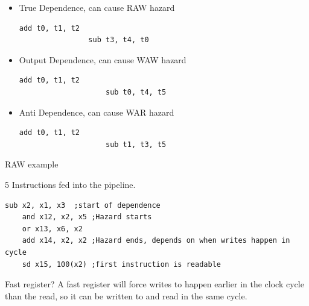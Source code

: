 \documentclass{report}
\begin{document}
\begin{description}
        \begin{itemize}
            \item True Dependence, can cause RAW hazard
                \begin{lstlisting}[language={[x86asm]Assembler}]
                add t0, t1, t2
                sub t3, t4, t0
                \end{lstlisting}
            \item Output Dependence, can cause WAW hazard
                \begin{lstlisting}[language={[x86asm]Assembler}]
                    add t0, t1, t2
                    sub t0, t4, t5
                \end{lstlisting}
            \item Anti Dependence, can cause WAR hazard
                \begin{lstlisting}[language={[x86asm]Assembler}]
                    add t0, t1, t2
                    sub t1, t3, t5
                \end{lstlisting}

        \end{itemize}

    \item RAW example
        \begin{mdframed}
            5 Instructions fed into the pipeline.
            \begin{lstlisting}[language={[x86asm]Assembler}]
    sub x2, x1, x3  ;start of dependence
    and x12, x2, x5 ;Hazard starts
    or x13, x6, x2
    add x14, x2, x2 ;Hazard ends, depends on when writes happen in cycle
    sd x15, 100(x2) ;first instruction is readable
            \end{lstlisting}

            Fast register? A fast register will force writes
            to happen earlier in the clock cycle than the read,
            so it can be written to and read in the same cycle.


\end{mdframed}
\end{description}
\end{document}

